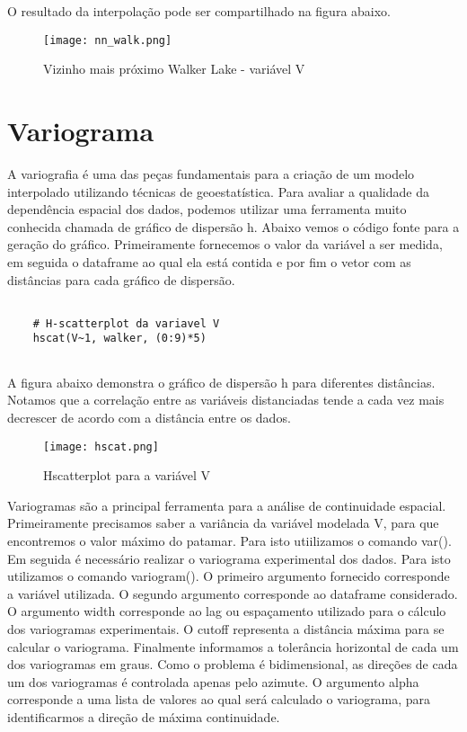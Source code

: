 O resultado da interpolação pode ser compartilhado na figura abaixo. 

\FloatBarrier
\begin{figure}[H]
	\centering
	\texttt{[image: nn\_walk.png]}	
	\caption{Vizinho mais próximo Walker Lake - variável V}
	\label{walk}
\end{figure}
\FloatBarrier

\section{Variograma} 

A variografia é uma das peças fundamentais para a criação de um modelo interpolado utilizando técnicas de geoestatística. Para avaliar a qualidade da dependência espacial dos dados, podemos utilizar uma ferramenta muito conhecida chamada de gráfico de dispersão h. Abaixo vemos o código fonte para a geração do gráfico. Primeiramente fornecemos o valor da variável a ser medida, em seguida o dataframe ao qual ela está contida e por fim o vetor com as distâncias para cada gráfico de dispersão.

\begin{scriptsize}
	\estiloR
	\begin{lstlisting}[caption={Criação de um vetor em R}, label=lst:rcode]
	
	# H-scatterplot da variavel V
	hscat(V~1, walker, (0:9)*5)
	
	\end{lstlisting}
\end{scriptsize}

A figura abaixo demonstra o gráfico de dispersão h para diferentes distâncias. Notamos que a correlação entre as variáveis distanciadas tende a cada vez mais decrescer de acordo com a distância entre os dados. 

\FloatBarrier
\begin{figure}[H]
	\centering
	\texttt{[image: hscat.png]}	
	\caption{Hscatterplot para a variável V}
	\label{walk}
\end{figure}
\FloatBarrier

Variogramas são a principal ferramenta para a análise de continuidade espacial. Primeiramente
 precisamos saber a variância da variável modelada V, para que encontremos o valor máximo do patamar. Para isto utiilizamos o comando var(). Em seguida é necessário realizar o variograma experimental dos dados. Para isto utilizamos o comando variogram(). O primeiro argumento fornecido corresponde a variável utilizada. O segundo argumento corresponde ao dataframe considerado. O argumento width corresponde ao lag ou espaçamento utilizado para o cálculo dos variogramas experimentais. O cutoff representa a distância máxima para se calcular o variograma. Finalmente informamos a tolerância horizontal de cada um dos variogramas em graus. Como o problema é bidimensional, as direções de cada um dos variogramas é controlada apenas pelo azimute. O argumento alpha corresponde a uma lista de valores ao qual será calculado o variograma, para identificarmos a direção de máxima continuidade. 

